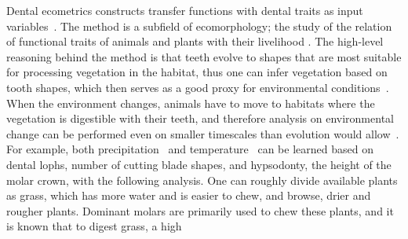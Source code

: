 \documentclass[english,twoside,openright]{UH_DS_MSc}
\begin{document}
Dental ecometrics constructs transfer functions with dental traits as input variables~\cite{Faith_Lyman_2019_ch9, oksanenHumboldtianApproachLife2019}.
The method is a subfield of ecomorphology; the study of the relation of functional traits of animals and plants with their livelihood
\cite{oksanenHumboldtianApproachLife2019}. The high-level reasoning behind the method is that teeth evolve to 
shapes that are most suitable for processing vegetation in the habitat, thus one can infer vegetation based on tooth shapes, 
which then serves as a good proxy for environmental conditions~\cite{oksanenHumboldtianApproachLife2019}. 
When the environment changes, animals have to move to habitats where the vegetation is digestible with their teeth, and therefore
analysis on environmental change can be performed even on smaller timescales than evolution would allow~\cite{fortelius}. For example, both precipitation~\cite{fortelius}
and temperature~\cite{oksanenHumboldtianApproachLife2019} can be learned based on dental lophs, number of cutting blade shapes, and hypsodonty, the height of the
molar crown, with the following analysis. One can roughly divide available plants as grass, which has more water and is easier to chew, and 
browse, drier and rougher plants. Dominant molars are primarily used to chew these plants, and it is known that to digest grass, a high 
\end{document}
